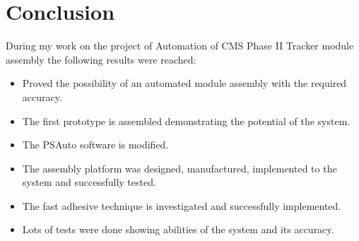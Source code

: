 \chapter{Conclusion}

During my work on the project of Automation of CMS Phase II Tracker module assembly the following results were reached:

\begin{itemize}
\item Proved the possibility of an automated module assembly with the required accuracy.
\item The first prototype is assembled demonstrating the potential of the system.
\item The PSAuto software is modified.
\item The assembly platform was designed, manufactured, implemented to the system and successfully tested.
\item The fast adhesive technique is investigated and successfully implemented.
\item Lots of tests were done showing abilities of the system and its accuracy.

\end{itemize}





